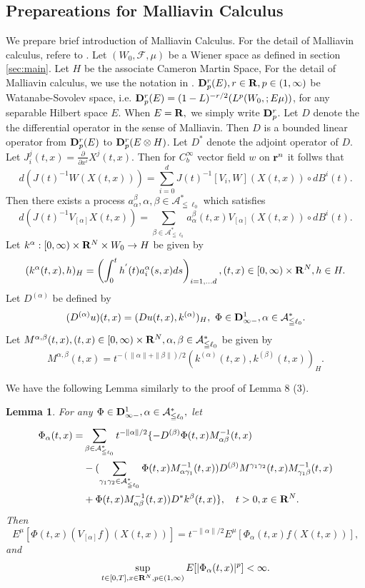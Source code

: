\documentclass[12pt]{article}
\newtheorem{lem}[thm]{Lemma}%
\begin{document}
\subsection{Prepareations for Malliavin Calculus}
We prepare brief introduction of Malliavin Calculus.
For the detail of Malliavin calculus, refere to \cite{K}.
Let $(W_0, \mathcal{F}, \mu)$ be a Wiener space as defined in
section \ref{sec:main}. Let $H$ be the associate Cameron Martin Space,
For the detail of Malliavin calculus, we use the notation in \cite{K}.
${\bf D}^r_p(E),
r \in {\bf R}, p \in (1, \infty)$ be Watanabe-Sovolev space, i.e. ${\bf D}^r_p
(E)= (1-L)^{-r/2}(L^p(W_0,;E \mu))$, for any separable Hilbert space $E$.
When $E={\bf R},$ we simply write ${\bf D}^r_p$. Let $D$ denote the the differential operator
in the sense of Malliavin. Then $D$ is a bounded linear operator from ${\bf D}^r_p(E)$
to ${\bf D}^r_p(E\otimes H)$. Let $D^*$ denote the adjoint operator of $D$.
Let $J_i^j(t, x)= \frac{\partial}{\partial x^i}X^j(t,x)$. Then for $C_b^{\infty
}$ vector field $w$ on ${\bf r}^n$ it follws that
$$d\left(J(t)^{-1}W(X(t, x))\right)=\sum_{i=0}^d J(t)^{-1}[V_i, W](X(t, x)) \circ dB^i(t).$$
Then there exists a process $a_{\alpha}^{\beta}, \alpha, \beta \in \mathcal{A}^*_{\leqq \ell_0}$ which satisfies 
$$d(J(t)^{-1}V_{[\alpha]}X(t, x))=\sum_{\beta \in \mathcal{A}^*_{\leqq \ell_0}}
a_{\alpha}^{\beta}(t, x) V_{[\alpha]} (X(t, x))\circ dB^i(t).$$
Let $k^{\alpha}: [0, \infty) \times {\bf R}^N \times W_0 \to H$ be given by
$$
(k^{\alpha}(t, x), h)_H  = \left(\int_0^t h^{'}(t) a_i^{\alpha} (s, x) ds\right)_{i=1, \dots d},
(t, x) \in [0, \infty)\times {\bf R}^N, h \in H.
$$
Let $D^{(\alpha)}$ be defined by
$$
(D^{(\alpha)}u)(t, x) = (Du(t, x), k^{(\alpha)})_H, \ \Phi \in {\bf D}_{\infty-}^1, 
\alpha \in \mathcal{A}^*_{\leqq \ell_0}.
$$
Let $M^{\alpha, \beta}(t, x), (t, x) \in [0, \infty) \times {\bf R}^N, \alpha, \beta \in \mathcal{A}^*_{\leqq \ell_0}$ be given by
$$
M^{\alpha, \beta}(t, x) = t^{-(\|\alpha\|+ \|\beta\|)/2} (k^{(\alpha)}(t,x), k^{(\beta)}(t,x))_H.
$$

We have the following Lemma similarly to the proof of \cite{K} Lemma 8 (3).  
\begin{lem} \label{rev}
For any $\Phi \in {\bf D}_{\infty-}^1, \alpha \in \mathcal{A}^*_{\leqq \ell_0},$ let
\begin{align*}
\Phi_{\alpha}(t,x)=&\sum_{\beta \in \mathcal{A}^*_{\leqq \ell_0}} t^{-\|\alpha\| / 2}\{ -D^{(\beta)} \Phi(t,x)M_{\alpha \beta}^{-1}(t,x) \\
&-(\sum_{\gamma_1 \gamma_2 \in \mathcal{A}^*_{\leqq \ell_0}} \Phi(t,x) M_{\alpha \gamma_1}^{-1}(t,x)) D^{(\beta )}
M^{\gamma_1 \gamma_2}(t,x) M_{\gamma_1 \beta}^{-1}(t,x) \\
&+ \Phi(t,x) M_{\alpha \beta}^{-1}(t,x)) D^* k^{\beta}(t,x) \}, \quad t>0, x \in {\bf R}^{N}.
\end{align*}
Then 
$$
E^{\mu}[\Phi(t,x) (V_{[\alpha]}f )(X(t,x))] = t^{-\|\alpha\| / 2}E^{\mu}[\Phi_{\alpha}(t,x) f(X(t,x))],
$$
and
$$\sup_{t\in[0,T], x \in {\bf R}^N, p\in (1, \infty)} E[|\Phi_{\alpha}(t,x)|^p] < \infty.$$
\\
\end{lem}
\end{document}
